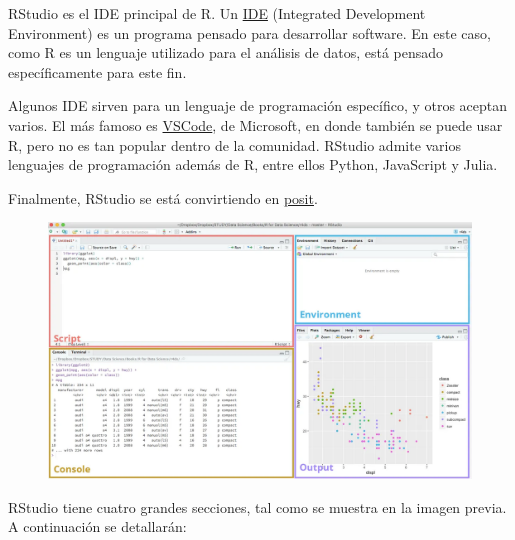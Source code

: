 \documentclass[
  letterpaper,
  DIV=11,
  numbers=noendperiod]{scrreprt}
\begin{document}
RStudio es el IDE principal de R. Un
\href{https://en.wikipedia.org/wiki/Integrated_development_environment}{IDE}
(Integrated Development Environment) es un programa pensado para
desarrollar software. En este caso, como R es un lenguaje utilizado para
el análisis de datos, está pensado específicamente para este fin.

Algunos IDE sirven para un lenguaje de programación específico, y otros
aceptan varios. El más famoso es
\href{https://code.visualstudio.com/}{VSCode}, de Microsoft, en donde
también se puede usar R, pero no es tan popular dentro de la comunidad.
RStudio admite varios lenguajes de programación además de R, entre ellos
Python, JavaScript y Julia.

Finalmente, RStudio se está convirtiendo en
\href{https://posit.co/}{posit}.

\begin{figure}

{\centering \includegraphics{chapters/images/rstudio2_gy2jzi.webp}

}

\end{figure}

RStudio tiene cuatro grandes secciones, tal como se muestra en la imagen
previa. A continuación se detallarán:
\end{document}
